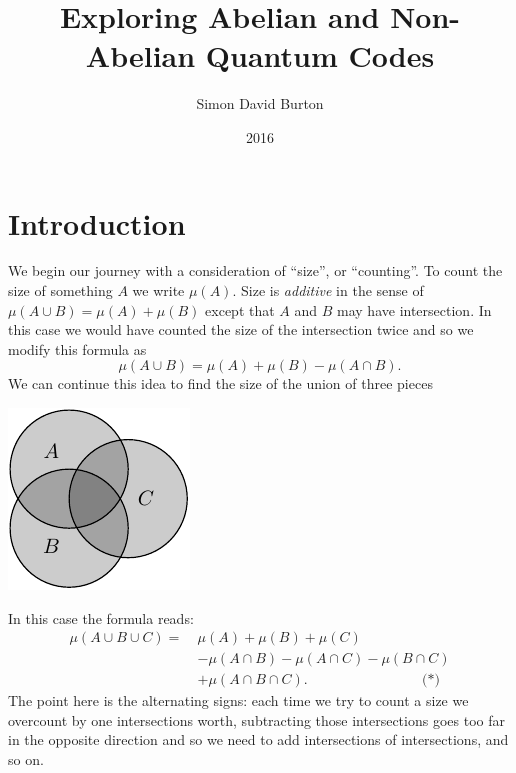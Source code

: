 \documentclass[11pt,twoside,openright]{report}
\title{Exploring Abelian and Non-Abelian Quantum Codes}
\author{Simon David Burton}
\date{2016}
\begin{document}
\maketitle


\declaration


\tableofcontents

\chapter{Introduction}

We begin our journey with a consideration of ``size'', or ``counting''.
To count the size of something $A$ we write $\mu(A).$
Size is \emph{additive} in the sense of 
$\mu(A\cup B) = \mu(A) + \mu(B)$ except that
$A$ and $B$ may have intersection.
In this case we would have counted the 
size of the intersection twice and so we modify this formula as
$$
    \mu(A\cup B) = \mu(A) + \mu(B) - \mu(A\cap B).
$$
We can continue this idea to find the
size of the union of three pieces
\begin{center}
\includegraphics{pic-ABC.pdf}
\end{center}
In this case the formula reads:
\begin{align*}
\mu(A\cup B\cup C) = \ &\mu(A) + \mu(B) + \mu(C)  \\
                     &- \mu(A\cap B) - \mu(A\cap C) - \mu(B\cap C) \\
                     &+ \mu(A\cap B \cap C).
\ \ \ \ \ \ \ \ \ \ \ \ \ \ \ \ \ \ \ \ \ \ \ \ \ \ \ \ \ \ \ \ \ \ \ \ \ \mbox{(*)}
\end{align*}
The point here is the alternating signs:
each time we try to count a size we overcount by
one intersections worth, subtracting those intersections
goes too far in the opposite direction and so we need
to add intersections of intersections, and so on.
\end{document}
